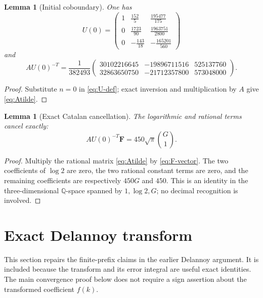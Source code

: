 \documentclass[11pt]{article}
\newtheorem{lemma}[theorem]{Lemma}
\theoremstyle{remark}
\newcommand{\Q}{\mathbb Q}
\begin{document}
\begin{lemma}[Initial coboundary]\label{lem:initial-U}
One has
\[
 U(0)=\begin{pmatrix}
 1&\frac{152}{5}&\frac{195477}{175}\\
 0&\frac{1723}{90}&\frac{1963751}{2800}\\
 0&-\frac{143}{18}&-\frac{165201}{560}
 \end{pmatrix}
\]
and
\begin{equation}\label{eq:Atilde}
 AU(0)^{-T}=\frac1{382493}
 \begin{pmatrix}
 30102216645&-19896711516&525137760\\
 32863650750&-21712357800&573048000
 \end{pmatrix}.
\end{equation}
\end{lemma}

\begin{proof}
Substitute $n=0$ in \eqref{eq:U-def}; exact inversion and
multiplication by $A$ give \eqref{eq:Atilde}.
\end{proof}

\begin{lemma}[Exact Catalan cancellation]\label{lem:cancellation}
The logarithmic and rational terms cancel exactly:
\begin{equation}\label{eq:exact-cancellation}
            AU(0)^{-T}\mathbf F=450\sqrt\pi\binom{G}{1}.
\end{equation}
\end{lemma}

\begin{proof}
Multiply the rational matrix \eqref{eq:Atilde} by
\eqref{eq:F-vector}.  The two coefficients of $\log2$ are zero,
the two rational constant terms are zero, and the remaining
coefficients are respectively $450G$ and $450$.  This is an identity
in the three-dimensional $\Q$-space spanned by $1,\log2,G$; no
decimal recognition is involved.
\end{proof}

\section{Exact Delannoy transform}

This section repairs the finite-prefix claims in the earlier
Delannoy argument.  It is included because the transform and its
error integral are useful exact identities.  The main convergence
proof below does not require a sign assertion about the transformed
coefficient $f(k)$.
\end{document}
